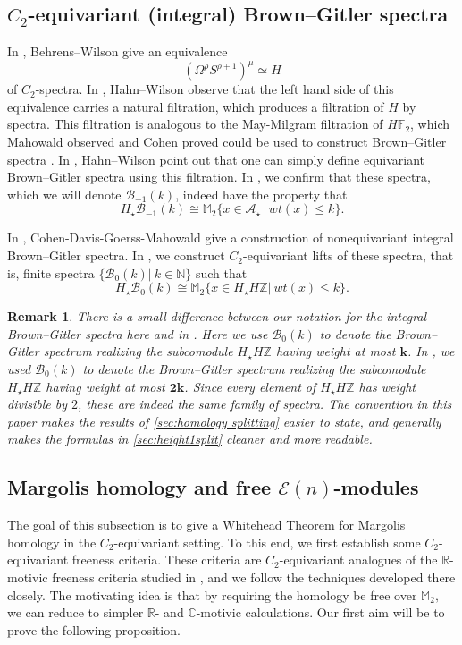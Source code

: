 \documentclass{amsart}
\newtheorem{remark}[equation]{Remark}
\theoremstyle{plain}
\numberwithin{equation}{section}
\numberwithin{figure}{section}
\newcommand{\mC}{{\mathbb C}}
\newcommand{\mF}{{\mathbb F}}
\newcommand{\mM}{{\mathbb M}}
\newcommand{\mN}{{\mathbb N}}
\newcommand{\mR}{{\mathbb R}}
\newcommand{\mZ}{{\mathbb Z}}
\newcommand{\cA}{{\mathcal A}}
\newcommand{\cB}{{\mathcal B}}
\newcommand{\cE}{{\mathcal E}}
\newcommand{\0}{\langle 0 \rangle }
\begin{document}
\subsection{{$C_2$-equivariant} (integral) Brown--Gitler spectra}
In \cite{BehrensWilson18}, Behrens--Wilson give an equivalence
\[
(\Omega^\rho S^{\rho + 1})^\mu \simeq H 
\]
of $C_2$-spectra. In \cite{HW2020}, Hahn--Wilson observe that the left hand side of this equivalence carries a natural filtration, which produces a filtration of $H$ by spectra. This filtration is analogous to the May-Milgram filtration of $H\mF_{2}$, which Mahowald observed and Cohen proved could be used to construct Brown--Gitler spectra \cite{cohen1985immersion, Mahowald1977}. In \cite{HW2020}, Hahn--Wilson point out that one can simply define equivariant Brown--Gitler spectra using this filtration. In \cite[Proposition 3.4]{LiPetersenTatum23}, we confirm that these spectra, which we will denote $\cB_{-1}(k)$, indeed have the property that
\[ H_{\star}\cB_{-1}(k) \cong \mM_{2}\{x \in \cA_{\star}\, |\, wt(x) \le k \}.\]

In \cite{CDGM1988}, Cohen-Davis-Goerss-Mahowald give a construction of nonequivariant integral Brown--Gitler spectra. 
In \cite[Thm~6.1]{LiPetersenTatum23}, we construct $C_{2}$-equivariant lifts of these spectra, that is, finite spectra $\{\cB_{0}(k)|\ k \in \mN\}$ such that 
\[
H_{\star}\cB_{0}(k) \cong \mM_{2}\{ x \in H_{\star}H\mZ|\ wt(x) \le k \}.
\]

\begin{remark} \label{remark:intBG}
    \rm{There is a small difference between our notation for the integral Brown--Gitler spectra here and in \cite{LiPetersenTatum23}. Here we use  $\cB_{0}(k)$ to denote the Brown--Gitler spectrum realizing the subcomodule $H_{\star}H\mZ$ having weight at most $\mathbf{k}$. In \cite{LiPetersenTatum23}, we used $\cB_{0}(k)$ to denote the Brown--Gitler spectrum realizing the subcomodule $H_{\star}H\mZ$ having weight at most $\mathbf{2k}$. Since every element of $H_{\star}H\mZ$ has weight divisible by $2$, these are indeed the same family of spectra. The convention in this paper makes the results of \cref{sec:homology splitting} easier to state, and generally makes the formulas in \cref{sec:height1split} cleaner and more readable.}
\end{remark}

\subsection{Margolis homology and free {$\cE(n)$}-modules}\label{sec: Margolis homology}
The goal of this subsection is to give a Whitehead Theorem for Margolis homology in the $C_{2}$-equivariant setting. To this end, we first establish some $C_2$-equivariant freeness criteria. These criteria are $C_2$-equivariant analogues of the $\mR$-motivic freeness criteria studied in \cite[Section~2]{BGL2022}, and we follow the techniques developed there closely. The motivating idea is that by requiring the homology be free over $\mM_2,$ we can reduce to simpler $\mR$- and $\mC$-motivic calculations. Our first aim will be to prove the following proposition. 
\end{document}
